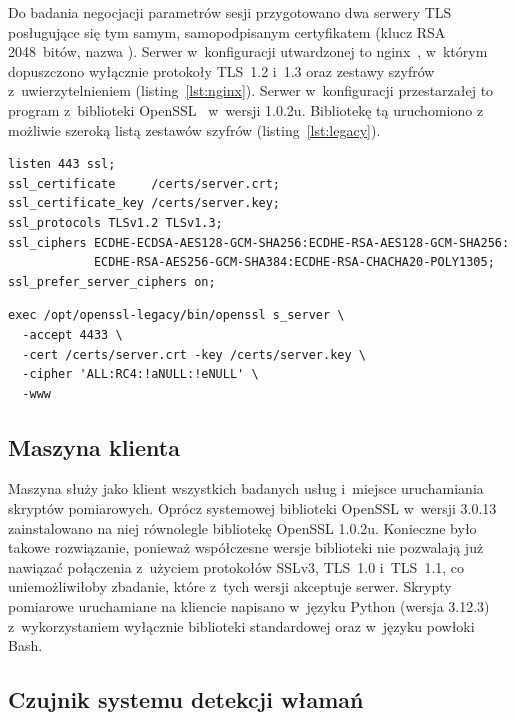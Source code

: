 Do badania negocjacji parametrów sesji przygotowano dwa serwery TLS posługujące się tym samym, samopodpisanym certyfikatem (klucz RSA 2048~bitów, nazwa ). Serwer w~konfiguracji utwardzonej to nginx~\cite{nginxssl}, w~którym dopuszczono wyłącznie protokoły TLS~1.2 i~1.3 oraz zestawy szyfrów z~uwierzytelnieniem (listing~\ref{lst:nginx}). Serwer w~konfiguracji przestarzałej to program  z~biblioteki OpenSSL~\cite{openssl} w~wersji 1.0.2u. Bibliotekę tą uruchomiono z możliwie szeroką listą zestawów szyfrów (listing~\ref{lst:legacy}).

\begin{lstlisting}[float=htbp,language={},caption={Konfiguracja protokołów i~szyfrów serwera utwardzonego (fragment)},label={lst:nginx}]
listen 443 ssl;
ssl_certificate     /certs/server.crt;
ssl_certificate_key /certs/server.key;
ssl_protocols TLSv1.2 TLSv1.3;
ssl_ciphers ECDHE-ECDSA-AES128-GCM-SHA256:ECDHE-RSA-AES128-GCM-SHA256:
            ECDHE-RSA-AES256-GCM-SHA384:ECDHE-RSA-CHACHA20-POLY1305;
ssl_prefer_server_ciphers on;
\end{lstlisting}

\begin{lstlisting}[float=htbp,language={},caption={Uruchomienie serwera w~konfiguracji przestarzałej},label={lst:legacy}]
exec /opt/openssl-legacy/bin/openssl s_server \
  -accept 4433 \
  -cert /certs/server.crt -key /certs/server.key \
  -cipher 'ALL:RC4:!aNULL:!eNULL' \
  -www
\end{lstlisting}

\subsection{Maszyna klienta}\label{sec:klient}

Maszyna  służy jako klient wszystkich badanych usług i~miejsce uruchamiania skryptów pomiarowych. Oprócz systemowej biblioteki OpenSSL w~wersji 3.0.13 zainstalowano na niej równolegle bibliotekę OpenSSL 1.0.2u. Konieczne było takowe rozwiązanie, ponieważ współczesne wersje biblioteki nie pozwalają już nawiązać połączenia z~użyciem protokołów SSLv3, TLS~1.0 i~TLS~1.1, co uniemożliwiłoby zbadanie, które z~tych wersji akceptuje serwer. Skrypty pomiarowe uruchamiane na kliencie napisano w~języku Python (wersja 3.12.3) z~wykorzystaniem wyłącznie biblioteki standardowej oraz w~języku powłoki Bash.

\subsection{Czujnik systemu detekcji włamań}\label{sec:czujnik}

